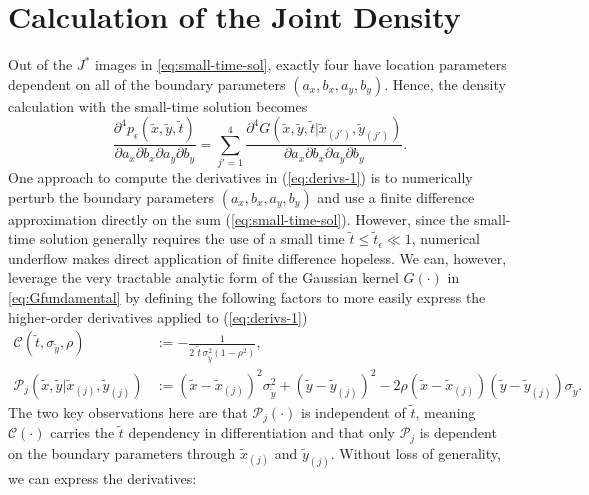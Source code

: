 \section{Calculation of the Joint Density}
Out of the $J^*$ images in \eqref{eq:small-time-sol}, exactly four
have location parameters dependent on all of the boundary parameters
$(a_x, b_x, a_y, b_y)$. Hence, the density calculation with the
small-time solution becomes
\begin{equation}
  \frac{\partial^4 p_\epsilon(\tilde{x}, \tilde{y}, \tilde{t})}{\partial a_x \partial b_x \partial a_y \partial b_y}  = \sum_{j'=1}^{4}
                                                                                                                        \frac{\partial^4G(\tilde{x},\tilde{y},\tilde{t}|\tilde{x}_{(j')},\tilde{y}_{(j')})}{\partial a_x \partial b_x \partial a_y \partial b_y}. \label{eq:derivs-1}
\end{equation}
One approach to compute the derivatives in (\ref{eq:derivs-1}) is to
numerically perturb the boundary parameters $(a_x,b_x,a_y,b_y)$ and
use a finite difference approximation directly on the sum
(\ref{eq:small-time-sol}). However, since the small-time solution
generally requires the use of a small time
$\tilde{t} \leq \tilde{t}_\epsilon \ll 1$, numerical underflow makes
direct application of finite difference hopeless.  We can, however,
leverage the very tractable analytic form of the Gaussian kernel
$G(\cdot)$ in \eqref{eq:Gfundamental} by defining the following
factors to more easily express the higher-order derivatives applied to
(\ref{eq:derivs-1})
\begin{align}
  \mathcal{C}(\tilde{t}, \sigma_{\tilde{y}}, \rho) &:= -\frac{1}{2\,\,\tilde{t}\, \sigma_{\tilde{y}}^2 (1-\rho^2)}, \\
  \mathcal{P}_j(\tilde{x},\tilde{y} | \tilde{x}_{(j)}, \tilde{y}_{(j)}) &:= \left(\tilde{x}- \tilde{x}_{(j)}\right)^2 \sigma_{\tilde{y}}^2 + \left(\tilde{y}-\tilde{y}_{(j)}\right)^2 - 2\rho(\tilde{x}-\tilde{x}_{(j)})(\tilde{y}-\tilde{y}_{(j)})\sigma_{\tilde{y}}.
\end{align}
The two key observations here are that $\mathcal{P}_j(\cdot)$ is
independent of $\tilde{t}$, meaning $\mathcal{C}(\cdot)$ carries the
$\tilde{t}$ dependency in differentiation and that only
$\mathcal{P}_j$ is dependent on the boundary parameters through
$\tilde{x}_{(j)}$ and $\tilde{y}_{(j)}$. Without loss of generality,
we can express the derivatives:
